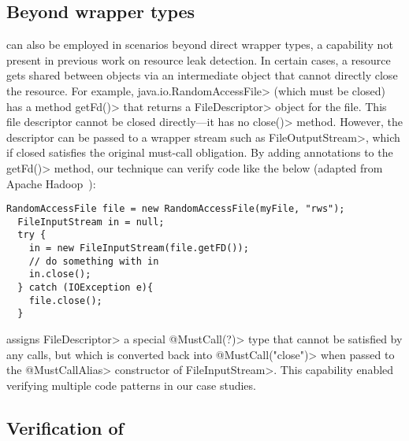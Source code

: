 
\subsection{Beyond wrapper types}

\mccannot can also be employed in scenarios beyond direct wrapper types, a
capability not present in previous work on resource leak detection.  In certain cases, a resource gets
shared between objects via an intermediate object that cannot directly close the
resource.  For example, \<java.io.RandomAccessFile> (which must be closed) has
a method \<getFd()> that returns a \<FileDescriptor>
object for the file. This file
descriptor cannot be closed directly---it has no \<close()> method.
However, the descriptor can be passed to a wrapper stream such as
\<FileOutputStream>, which if closed satisfies the original must-call
obligation.  By adding \mccannot annotations to the \<getFd()> method, our
technique can verify code like the below (adapted from Apache Hadoop~\cite{hadoop-random-access-file}):
\begin{lstlisting}[frame=tb,belowskip=3mm]
  RandomAccessFile file = new RandomAccessFile(myFile, "rws");
  FileInputStream in = null;
  try {
    in = new FileInputStream(file.getFD());
    // do something with in  
    in.close();
  } catch (IOException e){
    file.close();
  }
\end{lstlisting}
\Tool assigns \<FileDescriptor>
a special \<@MustCall(?)> type that cannot be satisfied by any calls,
but which is converted back into \<@MustCall("close")> when passed to the \<@MustCallAlias> constructor
of \<FileInputStream>. This capability enabled
verifying multiple code patterns in our case studies.

\subsection{Verification of \mccannot}\label{sec:mccannot-verification}

